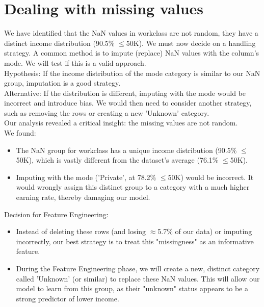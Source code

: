 \section{Dealing with missing values}

We have identified that the NaN values in workclass are not random, they have a distinct income distribution (90.5\% $\le$50K).
We must now decide on a handling strategy. A common method is to impute (replace) NaN values with the column's mode. We will test if this is a valid approach.\\

Hypothesis: If the income distribution of the mode category is similar to our NaN group, imputation is a good strategy.\\

Alternative: If the distribution is different, imputing with the mode would be incorrect and introduce bias. We would then need to consider another strategy, such as removing the rows or creating a new 'Unknown' category.\\

\noindent Our analysis revealed a critical insight: the missing values are not random.\\

\noindent We found: 
\begin{itemize}
    \item The NaN group for workclass has a unique income distribution (90.5\% $\le$50K), which is vastly different from the dataset's average (76.1\% $\le$50K).

    \item Imputing with the mode ('Private', at 78.2\% $\le$50K) would be incorrect. It would wrongly assign this distinct group to a category with a much higher earning rate, thereby damaging our model.
\end{itemize}

\noindent Decision for Feature Engineering:

\begin{itemize}
    \item Instead of deleting these rows (and losing $\approx$5.7\% of our data) or imputing incorrectly, our best strategy is to treat this "missingness" as an informative feature.

    \item During the Feature Engineering phase, we will create a new, distinct category called 'Unknown' (or similar) to replace these NaN values. This will allow our model to learn from this group, as their "unknown" status appears to be a strong predictor of lower income.
\end{itemize}

